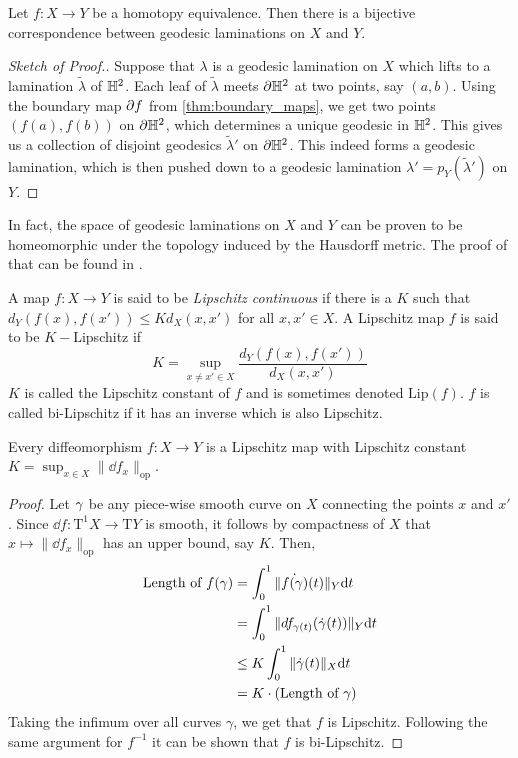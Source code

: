 \begin{theorem}\label{thm:laminations}
  Let $f:X\to Y$ be a homotopy equivalence. Then there is a bijective correspondence between geodesic laminations on $X$ and $Y$.
\end{theorem}
\begin{proof}[Sketch of Proof.]
  Suppose that $\lambda$ is a geodesic lamination on $X$ which lifts to a lamination $\tilde{\lambda}$ of $\mathbb{H}^2$. Each leaf of $\tilde{\lambda}$ meets ${\partial \mathbb{H}^2}$ at two points, say $(a,b)$. Using the boundary map $\partial f$ from \ref{thm:boundary_maps}, we get two points $(f(a),f(b))$ on ${\partial \mathbb{H}^2}$, which determines a unique geodesic in $\mathbb{H}^2$. This gives us a collection of disjoint geodesics $\tilde{\lambda}'$ on ${\partial \mathbb{H}^2}$. This indeed forms a geodesic lamination, which is then pushed down to a geodesic lamination $\lambda' = p_Y(\tilde{\lambda}')$ on $Y$. 
\end{proof}
\begin{rem}
  In fact, the space of geodesic laminations on $X$ and $Y$ can be proven to be homeomorphic under the topology induced by the Hausdorff metric. The proof of that can be found in \cite{casson}. 
\end{rem}
\begin{definition}
  A map $f:X\to Y$ is said to be \textit{Lipschitz continuous} if there is a $K$ such that $d_Y(f(x),f(x'))\leq Kd_X(x,x')$ for all $x,x'\in X$. A Lipschitz map $f$ is said to be $K-$Lipschitz if
  $$K = \sup_{x\neq x'\in X}\frac{d_Y(f(x),f(x'))}{d_X(x,x')}$$
  $K$ is called the Lipschitz constant of $f$ and is sometimes denoted $\text{Lip}(f)$. $f$ is called bi-Lipschitz if it has an inverse which is also Lipschitz.
\end{definition}
\begin{proposition}
  Every diffeomorphism $f:X\to Y$ is a Lipschitz map with Lipschitz constant $K = \sup_{x\in X}\|\dd f_x\|_{\text{op}}$.
\end{proposition}
\begin{proof}
  Let $\gamma$ be any piece-wise smooth curve on $X$ connecting the points $x$ and $x'$. Since $\dd f:\text{T}^1X\to \text{T}Y$ is smooth, it follows by compactness of $X$ that $x \mapsto \|\dd f_x\|_{\text{op}}$ has an upper bound, say $K$. Then,
  \begin{align*}
    \text{Length of}\ f(\gamma) &= \int_0^1 \|\dot{f(\gamma)}(t)\|_Y \text{d} t \\ &= \int_0^1 \|df_{\gamma(t)}(\dot{\gamma}(t))\|_Y\text{d} t\\ &\leq K \int_0^1 \|\dot{\gamma}(t)\|_X \text{d} t\\ &= K\cdot (\text{Length of}\ \gamma)
  \end{align*}
  Taking the infimum over all curves $\gamma$, we get that $f$ is Lipschitz. Following the same argument for $f^{-1}$ it can be shown that $f$ is bi-Lipschitz.
\end{proof}

